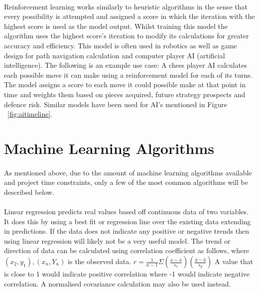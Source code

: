 \paragraph{}Reinforcement learning works similarly to heuristic algorithms in the sense that every possibility is attempted and assigned a score in which the iteration with the highest score is used as the model output. Whilst training this model the algorithm uses the highest score’s iteration to modify its calculations for greater accuracy and efficiency. This model is often used in robotics as well as game design for path navigation calculation and computer player AI (artificial intelligence). The following is an example use case: A chess player AI calculates each possible move it can make using a reinforcement model for each of its turns. The model assigns a score to each move it could possible make at that point in time and weights them based on pieces acquired, future strategy prospects and defence risk.
Similar models have been used for AI’s mentioned in Figure ~\ref{fig:aitimeline}.


\section{Machine Learning Algorithms}
\label{sec:section6}

\paragraph{}As mentioned above, due to the amount of machine learning algorithms available and project time constraints, only a few of the most common algorithms will be described below.

\paragraph{}Linear regression predicts real values based off continuous data of two variables. It does this by using a best fit or regression line over the existing data extending in predictions. If the data does not indicate any positive or negative trends then using linear regression will likely not be a very useful model. The trend or direction of data can be calculated using correlation coefficient as follows, where $\left( {{x_2},{y_1}} \right),\left( {{x_n},{Y_n}} \right)$ is the observed data.
	$r = \frac{1}{{n - 1}}\Sigma \left( {\frac{{x - \bar x}}{{{s_x}}}} \right)\left( {\frac{{y - \bar y}}{{{s_y}}}} \right)$
A value that is close to 1 would indicate positive correlation where -1 would indicate negative correlation. A normalised covariance calculation may also be used instead.

